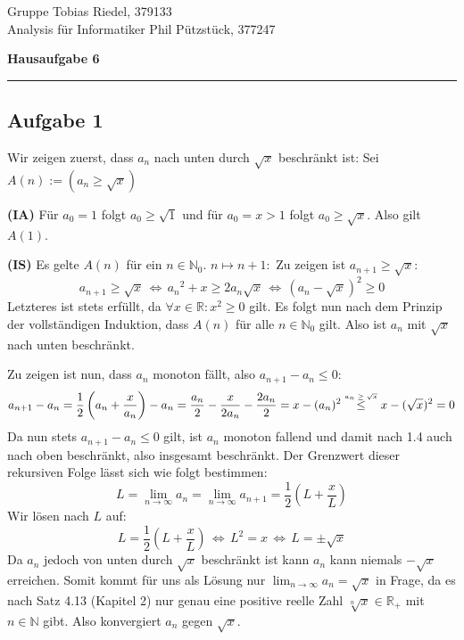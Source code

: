 \documentclass[a4paper,graphics,11pt]{article}
\newcommand{\aufgabe}[1]{\subsection*{Aufgabe #1}}
\newcommand{\up}[2]{\mathrel{\overset{\makebox[0pt]{\mbox{\normalfont\tiny #2}}}{#1}}}
\begin{document}
\noindent Gruppe              \hfill Tobias Riedel, 379133 \\
\noindent Analysis für Informatiker             \hfill Phil Pützstück, 377247 \\
\begin{center}
	\LARGE{\textbf{Hausaufgabe 6}}
\end{center}
\begin{center}
\rule[0.1ex]{\textwidth}{1pt}
\end{center}
\aufgabe{1}
Wir zeigen zuerst, dass $a_n$ nach unten durch $\sqrt{x}$ beschränkt ist:
Sei $A(n) := (a_n \geq \sqrt{x})$

\textbf{(IA)}
Für $a_0 = 1$ folgt $a_0 \geq \sqrt{1}$ und für $a_0 = x > 1$ folgt $a_0 \geq \sqrt{x}$. Also gilt $A(1)$.

\textbf{(IS)} Es gelte $A(n)$ für ein $n\in \mathbb{N}_0$. $n\mapsto n+1\colon$
Zu zeigen ist $a_{n+1} \geq \sqrt{x}\colon$
$$
    a_{n+1} \geq \sqrt{x} \,\Longleftrightarrow\, {a_n}^2+x \geq 2a_n\sqrt{x}
    \,\Longleftrightarrow\, (a_n-\sqrt{x})^2 \geq 0
$$
Letzteres ist stets erfüllt, da $\forall x \in \mathbb{R}\colon x^2 \geq 0$ gilt. Es folgt
nun nach dem Prinzip der vollständigen Induktion, dass $A(n)$ für alle $n\in \mathbb{N}_0$
gilt. Also ist $a_n$ mit $\sqrt{x}$ nach unten beschränkt.

Zu zeigen ist nun, dass $a_n$ monoton fällt, also $a_{n+1} - a_n \leq 0$:
$$
    a_{n+1} - a_n = \frac{1}{2}\left(a_n+\frac{x}{a_n}\right) - a_n
    = \frac{a_n}{2} - \frac{x}{2a_n} - \frac{2a_n}{2} = x - (a_n)^2\quad
    \up{\leq}{$a_n \geq \sqrt{x}$} \quad x-(\sqrt{x})^2 = 0
$$
Da nun stets $a_{n+1}-a_n \leq 0$ gilt, ist $a_n$ monoton fallend und damit nach 1.4 auch
nach oben beschränkt, also insgesamt beschränkt.
Der Grenzwert dieser rekursiven Folge lässt sich wie folgt bestimmen:
$$
    L = \lim_{n \to \infty} a_n = \lim_{n \to \infty} a_{n+1}
    = \frac{1}{2}\left(L + \frac{x}{L}\right)
$$
Wir lösen nach $L$ auf:
$$
    L = \frac{1}{2}\left(L + \frac{x}{L}\right) \,\Longleftrightarrow\, L^2 = x
    \,\Longleftrightarrow\, L = \pm \sqrt{x}
$$
Da $a_n$ jedoch von unten durch $\sqrt{x}$ beschränkt ist kann $a_n$ kann niemals
$-\sqrt{x}$ erreichen. Somit kommt für uns als Lösung nur
$\lim_{n \to \infty}\limits a_n = \sqrt{x}$ in Frage, da es nach Satz 4.13 (Kapitel 2) nur
genau eine positive reelle Zahl $\sqrt[n]{x}\in \mathbb{R}_+ $ mit $n \in \mathbb{N}$ gibt.
Also konvergiert $a_n$ gegen $\sqrt{x}$.
\end{document}
